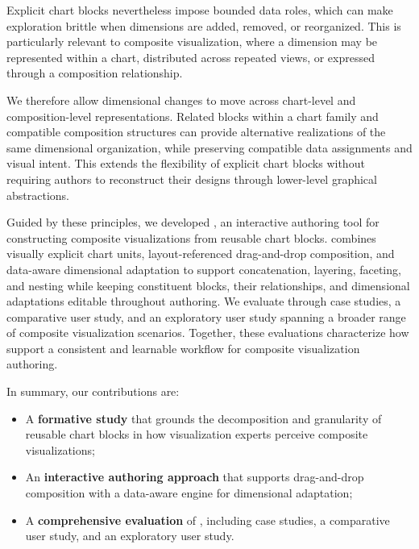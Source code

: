 Explicit chart blocks nevertheless impose bounded data roles, which can make
exploration brittle when dimensions are added, removed, or reorganized. This
is particularly relevant to composite visualization, where a dimension may be
represented within a chart, distributed across repeated views, or expressed
through a composition relationship.

We therefore allow dimensional changes to move across chart-level and
composition-level representations. Related blocks within a chart family and
compatible composition structures can provide alternative realizations of the
same dimensional organization, while preserving compatible data assignments
and visual intent. This extends the flexibility of explicit chart blocks
without requiring authors to reconstruct their designs through lower-level
graphical abstractions.



Guided by these principles, we developed {\system}, an interactive authoring
tool for constructing composite visualizations from reusable chart blocks.
{\system} combines visually explicit chart units, layout-referenced
drag-and-drop composition, and data-aware dimensional adaptation to support
concatenation, layering, faceting, and nesting while keeping constituent
blocks, their relationships, and dimensional adaptations editable
throughout authoring.
We evaluate {\system} through case studies, a comparative user study, 
and an exploratory
user study spanning a broader range of composite visualization scenarios.
Together, these evaluations characterize how {\system} support a
consistent and learnable workflow for composite visualization authoring.


In summary, our contributions are:
\begin{itemize}
    \item A \textbf{formative study} that grounds the decomposition and granularity
    of reusable chart blocks in how visualization experts perceive composite
    visualizations;


    \item An \textbf{interactive authoring approach} that supports
     drag-and-drop composition with a data-aware engine
    for dimensional adaptation;


    \item A \textbf{comprehensive evaluation} of {\system}, including case studies, a comparative user study, and an exploratory user study.
\end{itemize}



